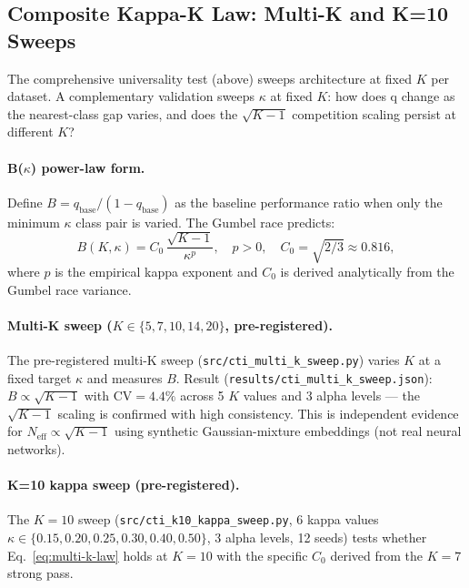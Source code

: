 \documentclass{article}
\begin{document}
\subsection{Composite Kappa-K Law: Multi-K and K=10 Sweeps}
\label{subsec:kappa-k-sweeps}

The comprehensive universality test (above) sweeps architecture at fixed $K$ per dataset.
A complementary validation sweeps $\kappa$ at fixed $K$: how does q change as the nearest-class
gap varies, and does the $\sqrt{K-1}$ competition scaling persist at different $K$?

\paragraph{B($\kappa$) power-law form.}
Define $B = q_\mathrm{base}/(1-q_\mathrm{base})$ as the baseline performance ratio when only
the minimum $\kappa$ class pair is varied. The Gumbel race predicts:
\begin{equation}
B(K,\kappa) = C_0\,\frac{\sqrt{K-1}}{\kappa^p},\quad p>0,\quad C_0=\sqrt{2/3}\approx 0.816,
\label{eq:multi-k-law}
\end{equation}
where $p$ is the empirical kappa exponent and $C_0$ is derived analytically from the
Gumbel race variance.

\paragraph{Multi-K sweep ($K\in\{5,7,10,14,20\}$, pre-registered).}
The pre-registered multi-K sweep (\texttt{src/cti\_multi\_k\_sweep.py})
varies $K$ at a fixed target $\kappa$ and measures $B$.
Result (\texttt{results/cti\_multi\_k\_sweep.json}): $B\propto\sqrt{K-1}$ with
$\mathrm{CV}=4.4\%$ across 5 $K$ values and 3 alpha levels --- the $\sqrt{K-1}$ scaling
is confirmed with high consistency. This is independent evidence for $N_\mathrm{eff}\propto\sqrt{K-1}$
using synthetic Gaussian-mixture embeddings (not real neural networks).

\paragraph{K=10 kappa sweep (pre-registered).}
The $K=10$ sweep (\texttt{src/cti\_k10\_kappa\_sweep.py}, 6 kappa values
$\kappa\in\{0.15,0.20,0.25,0.30,0.40,0.50\}$, 3 alpha levels, 12 seeds)
tests whether Eq.~\ref{eq:multi-k-law} holds at $K=10$ with the specific $C_0$
derived from the $K=7$ strong pass.
\end{document}
